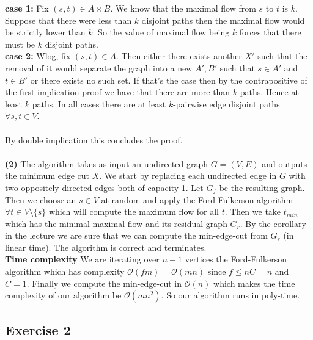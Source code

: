 \documentclass[10pt,a4paper]{article}
\begin{document}
\textbf{case 1:}  Fix $(s,t) \in A\times B$. We know that the maximal flow from $s$ to $t$ is $k$. Suppose that there were less than $k$ disjoint paths then the maximal flow would be strictly lower than $k$. So the value of maximal flow being $k$ forces that there must be $k$ disjoint paths. \\
\textbf{case 2:} Wlog, fix $(s,t) \in A$. Then either there exists another $X'$ such that the removal of it would separate the graph into a new $A', B'$ such that $s \in A'$ and $t \in B'$ or there exists no such set. If that's the case then by the contrapositive of the first implication proof we have that there are more than $k$ paths. Hence at least $k$ paths. 
In all cases there are at least $k$-pairwise edge disjoint paths $\forall s,t \in V$.\\\\By double implication this concludes the proof.\\\\
\textbf{(2)}
The algorithm takes as input an undirected graph $ G = (V, E)$ and outputs the minimum edge cut $X$. 
We start by replacing each undirected edge in $G$ with two oppositely directed edges both of capacity 1.  Let $G_f$ be the resulting graph. Then we choose an $s \in V$ at random and apply the Ford-Fulkerson algorithm $\forall t \in V\setminus \{s\}$ which will compute the maximum flow for all $t$. Then we take $t_{min}$ which has the minimal maximal flow and its residual graph $G_r$. By the corollary in the lecture we are sure that we can compute the min-edge-cut from $G_r$ (in linear time). The algorithm is correct and terminates. \\
\textbf{Time complexity} We are iterating over $n-1$ vertices the Ford-Fulkerson algorithm which has complexity $\mathcal{O}(fm) = \mathcal{O}(mn)$ since $f \leq nC = n$ and $C = 1$. Finally we compute the min-edge-cut in $\mathcal{O}(n)$ which makes the time complexity of our algorithm be $\mathcal{O}(mn^2)$. So our algorithm runs in poly-time. 


\subsection*{Exercise 2}
\end{document}
